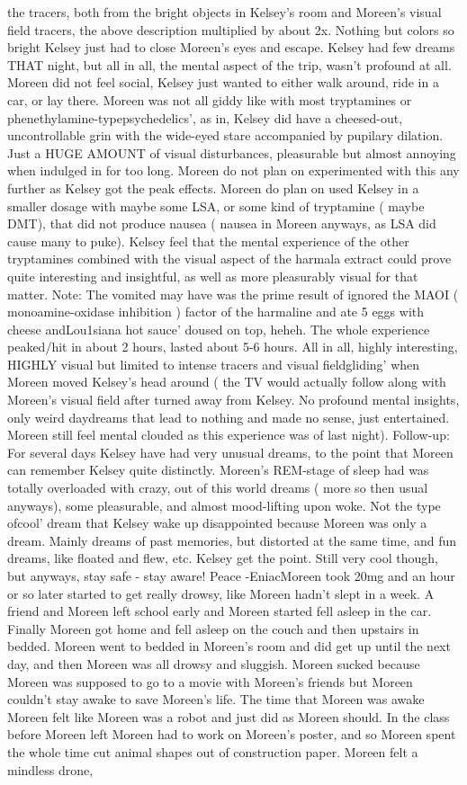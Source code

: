\documentclass[12pt]{book}
\begin{document}
the tracers, both from the bright objects in Kelsey's room and Moreen's visual field tracers, the above description multiplied by about 2x. Nothing but colors so bright Kelsey just had to close Moreen's eyes and escape. Kelsey had few dreams THAT night, but all in all, the mental aspect of the trip, wasn't profound at all. Moreen did not feel social, Kelsey just wanted to either walk around, ride in a car, or lay there. Moreen was not all giddy like with most tryptamines or phenethylamine-typepsychedelics', as in, Kelsey did have a cheesed-out, uncontrollable grin with the wide-eyed stare accompanied by pupilary dilation. Just a HUGE AMOUNT of visual disturbances, pleasurable but almost annoying when indulged in for too long. Moreen do not plan on experimented with this any further as Kelsey got the peak effects. Moreen do plan on used Kelsey in a smaller dosage with maybe some LSA, or some kind of tryptamine ( maybe DMT), that did not produce nausea ( nausea in Moreen anyways, as LSA did cause many to puke). Kelsey feel that the mental experience of the other tryptamines combined with the visual aspect of the harmala extract could prove quite interesting and insightful, as well as more pleasurably visual for that matter. Note: The vomited may have was the prime result of ignored the MAOI ( monoamine-oxidase inhibition ) factor of the harmaline and ate 5 eggs with cheese andLou1siana hot sauce' doused on top, heheh. The whole experience peaked/hit in about 2 hours, lasted about 5-6 hours. All in all, highly interesting, HIGHLY visual but limited to intense tracers and visual fieldgliding' when Moreen moved Kelsey's head around ( the TV would actually follow along with Moreen's visual field after turned away from Kelsey. No profound mental insights, only weird daydreams that lead to nothing and made no sense, just entertained. Moreen still feel mental clouded as this experience was of last night). Follow-up: For several days Kelsey have had very unusual dreams, to the point that Moreen can remember Kelsey quite distinctly. Moreen's REM-stage of sleep had was totally overloaded with crazy, out of this world dreams ( more so then usual anyways), some pleasurable, and almost mood-lifting upon woke. Not the type ofcool' dream that Kelsey wake up disappointed because Moreen was only a dream. Mainly dreams of past memories, but distorted at the same time, and fun dreams, like floated and flew, etc. Kelsey get the point. Still very cool though, but anyways, stay safe - stay aware! Peace -EniacMoreen took 20mg and an hour or so later started to get really drowsy, like Moreen hadn't slept in a week. A friend and Moreen left school early and Moreen started fell asleep in the car. Finally Moreen got home and fell asleep on the couch and then upstairs in bedded. Moreen went to bedded in Moreen's room and did get up until the next day, and then Moreen was all drowsy and sluggish. Moreen sucked because Moreen was supposed to go to a movie with Moreen's friends but Moreen couldn't stay awake to save Moreen's life. The time that Moreen was awake Moreen felt like Moreen was a robot and just did as Moreen should. In the class before Moreen left Moreen had to work on Moreen's poster, and so Moreen spent the whole time cut animal shapes out of construction paper. Moreen felt a mindless drone, 
\end{document}
